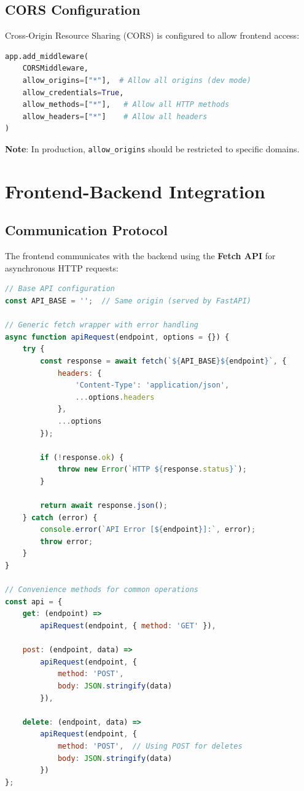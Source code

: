 \documentclass[12pt,a4paper]{article}
\begin{document}
\subsection{CORS Configuration}

Cross-Origin Resource Sharing (CORS) is configured to allow frontend access:

\begin{lstlisting}[language=Python, caption=CORS middleware configuration]
app.add_middleware(
    CORSMiddleware,
    allow_origins=["*"],  # Allow all origins (dev mode)
    allow_credentials=True,
    allow_methods=["*"],   # Allow all HTTP methods
    allow_headers=["*"]    # Allow all headers
)
\end{lstlisting}

\textbf{Note}: In production, \texttt{allow\_origins} should be restricted to specific domains.

\section{Frontend-Backend Integration}

\subsection{Communication Protocol}

The frontend communicates with the backend using the \textbf{Fetch API} for asynchronous HTTP requests:

\begin{lstlisting}[language=JavaScript, caption=API utility functions]
// Base API configuration
const API_BASE = '';  // Same origin (served by FastAPI)

// Generic fetch wrapper with error handling
async function apiRequest(endpoint, options = {}) {
    try {
        const response = await fetch(`${API_BASE}${endpoint}`, {
            headers: {
                'Content-Type': 'application/json',
                ...options.headers
            },
            ...options
        });
        
        if (!response.ok) {
            throw new Error(`HTTP ${response.status}`);
        }
        
        return await response.json();
    } catch (error) {
        console.error(`API Error [${endpoint}]:`, error);
        throw error;
    }
}

// Convenience methods for common operations
const api = {
    get: (endpoint) => 
        apiRequest(endpoint, { method: 'GET' }),
    
    post: (endpoint, data) => 
        apiRequest(endpoint, {
            method: 'POST',
            body: JSON.stringify(data)
        }),
    
    delete: (endpoint, data) =>
        apiRequest(endpoint, {
            method: 'POST',  // Using POST for deletes
            body: JSON.stringify(data)
        })
};
\end{lstlisting}
\end{document}
